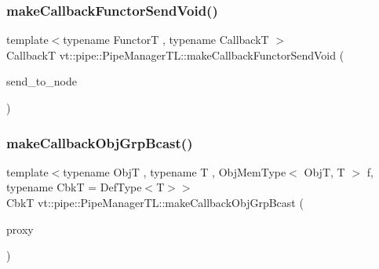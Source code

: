 \mbox{\label{structvt_1_1pipe_1_1_pipe_manager_t_l_a71bfb005f664ca5f0f6935afbcdb17de}} 
\subsubsection{\texorpdfstring{make\+Callback\+Functor\+Send\+Void()}{makeCallbackFunctorSendVoid()}\hspace{0.1cm}{\footnotesize\ttfamily [2/2]}}
{\footnotesize\ttfamily template$<$typename FunctorT , typename CallbackT $>$ \\
CallbackT vt\+::pipe\+::\+Pipe\+Manager\+T\+L\+::make\+Callback\+Functor\+Send\+Void (\begin{DoxyParamCaption}\item[{\hyperlink{namespacevt_a866da9d0efc19c0a1ce79e9e492f47e2}{Node\+Type} const \&}]{send\+\_\+to\+\_\+node }\end{DoxyParamCaption})}

\mbox{\label{structvt_1_1pipe_1_1_pipe_manager_t_l_a8a4da1e38acd018f847aa9fddae44956}} 
\subsubsection{\texorpdfstring{make\+Callback\+Obj\+Grp\+Bcast()}{makeCallbackObjGrpBcast()}\hspace{0.1cm}{\footnotesize\ttfamily [1/2]}}
{\footnotesize\ttfamily template$<$typename ObjT , typename T , Obj\+Mem\+Type$<$ Obj\+T, T $>$ f, typename CbkT  = Def\+Type$<$\+T$>$$>$ \\
CbkT vt\+::pipe\+::\+Pipe\+Manager\+T\+L\+::make\+Callback\+Obj\+Grp\+Bcast (\begin{DoxyParamCaption}\item[{\hyperlink{structvt_1_1objgroup_1_1proxy_1_1_proxy}{objgroup\+::proxy\+::\+Proxy}$<$ ObjT $>$}]{proxy }\end{DoxyParamCaption})}

